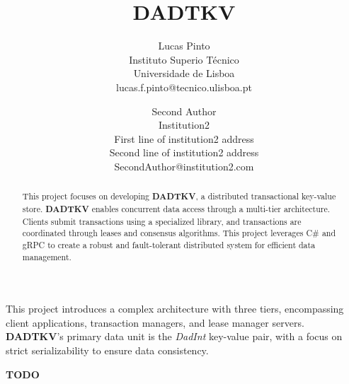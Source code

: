 \documentclass[times, 10pt,twocolumn]{article}
\begin{document}
\title{DADTKV}

\author{Lucas Pinto\\
Instituto Superio Técnico\\
Universidade de Lisboa\\
lucas.f.pinto@tecnico.ulisboa.pt\\
\and
Second Author\\
Institution2\\
First line of institution2 address\\ Second line of institution2 address\\ 
SecondAuthor@institution2.com\\
}

\maketitle
\thispagestyle{empty}

\begin{abstract}
   This project focuses on developing \textbf{DADTKV}, a distributed transactional key-value store.
   \textbf{DADTKV} enables concurrent data access through a multi-tier architecture.
   Clients submit transactions using a specialized library, and transactions are coordinated
   through leases and consensus algorithms. This project leverages C\# and gRPC to create
   a robust and fault-tolerant distributed system for efficient data management.
\end{abstract}




This project introduces a complex architecture with three tiers, encompassing client applications,
transaction managers, and lease manager servers. \textbf{DADTKV}'s primary data unit is the \textit{DadInt}
key-value pair, with a focus on strict serializability to ensure data consistency.


\textbf{TODO}

\end{document}
